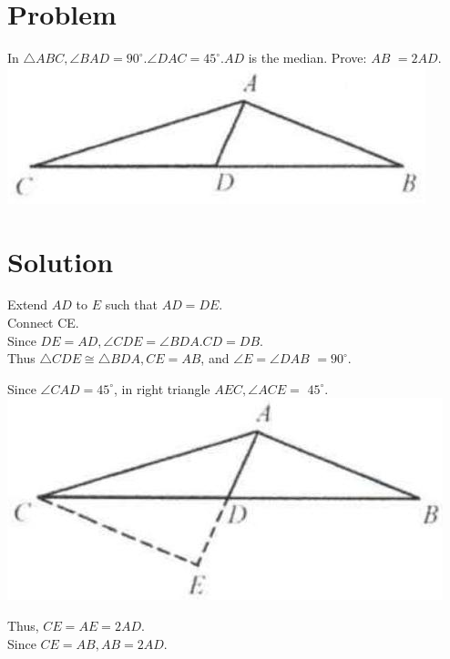 \documentclass{article}
\begin{document}
\section*{Problem}
In \(\triangle A B C, \angle B A D=90^{\circ} . \angle D A C=45^{\circ} . A D\) is the median. Prove: \(A B\) \(=2 A D\).\\
\centering
\includegraphics[width=\textwidth]{images/027(3).jpg}

\section*{Solution}
Extend \(A D\) to \(E\) such that \(A D=D E\).\\
Connect CE.\\
Since \(D E=A D, \angle C D E=\angle B D A . C D=D B\).\\
Thus \(\triangle C D E \cong \triangle B D A, C E=A B\), and \(\angle E=\angle D A B\) \(=90^{\circ}\).

Since \(\angle C A D=45^{\circ}\), in right triangle \(A E C, \angle A C E=\) \(45^{\circ}\).\\
\centering
\includegraphics[width=\textwidth]{images/029.jpg}

Thus, \(C E=A E=2 A D\).\\
Since \(C E=A B, A B=2 A D\).
\end{document}
